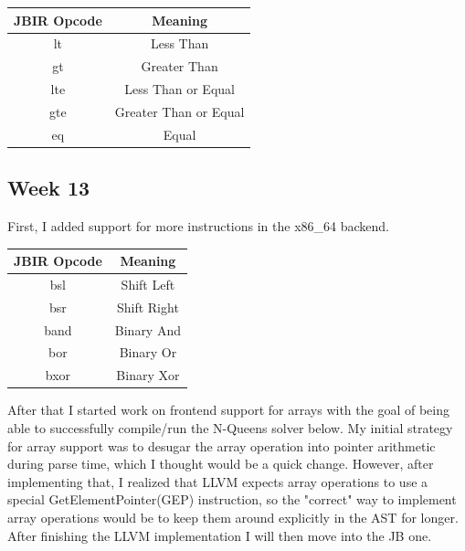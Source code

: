 \documentclass[11pt, a4paper, titlepage]{article}
\begin{document}
\begin{table}[h!]
  \centering
  \begin{tabular}{|c|c|}
  \hline
  \textbf{JBIR Opcode} & \textbf{Meaning} \\
  \hline
  \hline
  lt & Less Than \\
  \hline
  gt & Greater Than \\
  \hline
  lte & Less Than or Equal \\
  \hline
  gte & Greater Than or Equal \\
  \hline
  eq & Equal \\
  \hline
  \end{tabular}
\end{table}
  
\subsection{Week 13}

First, I added support for more instructions in the x86\_64 backend.

\begin{table}[h!]
  \centering
  \begin{tabular}{|c|c|}
  \hline
  \textbf{JBIR Opcode} & \textbf{Meaning} \\
  \hline
  \hline
  bsl & Shift Left \\
  \hline
  bsr & Shift Right \\
  \hline
  band & Binary And \\
  \hline
  bor & Binary Or \\
  \hline
  bxor & Binary Xor \\
  \hline
  \end{tabular}
\end{table}

After that I started work on frontend support for arrays with the goal of being able to successfully compile/run the N-Queens solver below. My initial strategy for array support was to desugar the array operation into pointer arithmetic during parse time, which I thought would be a quick change. However, after implementing that, I realized that LLVM expects array operations to use a special GetElementPointer(GEP) instruction, so the "correct" way to implement array operations would be to keep them around explicitly in the AST for longer. After finishing the LLVM implementation I will then move into the JB one.
\end{document}
